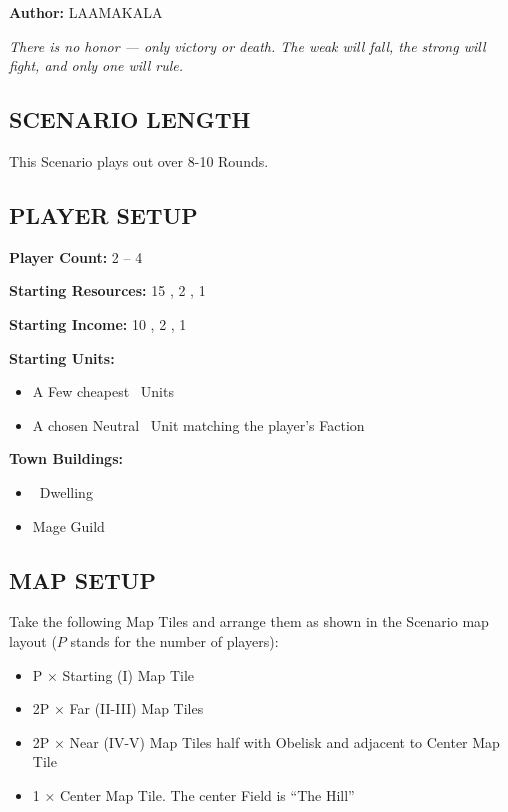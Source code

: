 
\begin{multicols*}{2}

\textbf{Author:} LAAMAKALA

\textit{There is no honor — only victory or death. The weak will fall, the strong will fight, and only one will rule.}

\subsection*{\MakeUppercase{Scenario Length}}
This Scenario plays out over 8-10 Rounds.

\subsection*{\MakeUppercase{Player Setup}}
\textbf{Player Count:} 2 -- 4

\textbf{Starting Resources:} 15 , 2 , 1 

\textbf{Starting Income:} 10 , 2 , 1 

\textbf{Starting Units:}
\begin{itemize}
  \item A Few cheapest \silver\ Units
  \item A chosen Neutral \bronze\ Unit matching the player's Faction
\end{itemize}

\textbf{Town Buildings:}
\begin{itemize}
  \item \bronze\ Dwelling
  \item Mage Guild
\end{itemize}

\subsection*{\MakeUppercase{Map Setup}}
Take the following Map Tiles and arrange them as shown in the Scenario map layout ($P$ stands for the number of players):

\begin{itemize}
  \item P × Starting (I) Map Tile
  \item 2P × Far (II-III) Map Tiles
  \item 2P × Near (IV-V) Map Tiles half with Obelisk and adjacent to Center Map Tile
  \item 1 × Center Map Tile. The center Field is ``The Hill''
\end{itemize}
\columnbreak


\end{multicols*}
